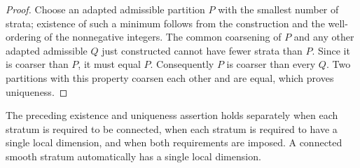 \begin{proof}
Choose an adapted admissible partition $P$ with the smallest number
of strata; existence of such a minimum follows from the construction
and the well-ordering of the nonnegative integers.  The common
coarsening of $P$ and any other adapted admissible $Q$ just constructed
cannot have fewer strata than $P$.  Since it is coarser than $P$,
it must equal $P$.  Consequently $P$ is coarser than every $Q$.
Two partitions with this property coarsen each other and are equal,
which proves uniqueness.
\end{proof}

\begin{theorem}
\label{thm:coarsest-smooth-partition-variants}
The preceding existence and uniqueness assertion holds separately
when each stratum is required to be connected, when each stratum
is required to have a single local dimension, and when both
requirements are imposed.  A connected smooth stratum automatically
has a single local dimension.
\end{theorem}

